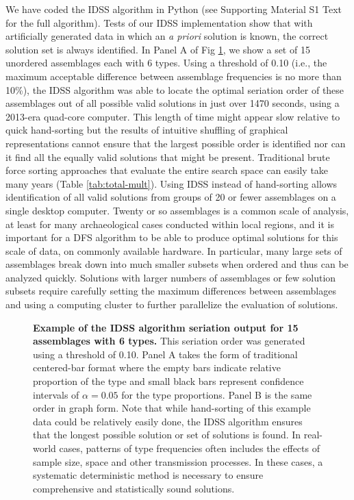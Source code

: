 \documentclass[10pt,letterpaper]{article}
\begin{document}
We have coded the IDSS algorithm in Python (see Supporting Material S1 Text for the full algorithm). Tests of our IDSS implementation show that with artificially generated data in which an \textit{a priori} solution is known, the correct solution set is always identified. In Panel A of Fig \ref{fig5}, we show a set of 15 unordered assemblages each with 6 types. Using a threshold of 0.10 (i.e., the maximum acceptable difference between assemblage frequencies is no more than 10\%), the IDSS algorithm was able to locate the optimal seriation order of these assemblages out of all possible valid solutions in just over 1470 seconds, using a 2013-era quad-core computer. This length of time might appear slow relative to quick hand-sorting but the results of intuitive shuffling of graphical representations cannot ensure that the largest possible order is identified nor can it find all the equally valid solutions that might be present. Traditional brute force sorting approaches that evaluate the entire search space can easily take many years (Table \ref{tab:total-mult}). Using IDSS instead of hand-sorting allows identification of all valid solutions from groups of 20 or fewer assemblages on a single desktop computer.  Twenty or so assemblages is a common scale of analysis, at least for many archaeological cases conducted within local regions, and it is important for a DFS algorithm to be able to produce optimal solutions for this scale of data, on commonly available hardware. In particular, many large sets of assemblages break down into much smaller subsets when ordered and thus can be analyzed quickly. Solutions with larger numbers of assemblages or few solution subsets require carefully setting the maximum differences between assemblages and using a computing cluster to further parallelize the evaluation of solutions. 

\begin{figure}[h]
\caption{{\bf Example of the IDSS algorithm seriation output for 15 assemblages with 6 types.} This seriation order was generated using a threshold of 0.10.  Panel A takes the form of traditional centered-bar format where the empty bars indicate relative proportion of the type and small black bars represent confidence intervals of $\alpha = 0.05$ for the type proportions. Panel B is the same order in graph form. Note that while hand-sorting of this example data could be relatively easily done, the IDSS algorithm ensures that the longest possible solution or set of solutions is found. In real-world cases, patterns of type frequencies often includes the effects of sample size, space and other transmission processes. In these cases, a systematic deterministic method is necessary to ensure comprehensive and statistically sound solutions. }
\label{fig5}
\end{figure}
\end{document}
